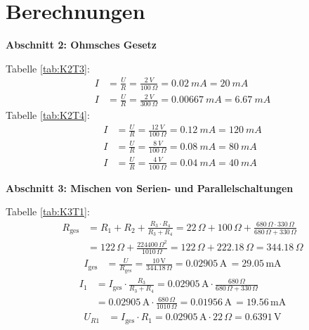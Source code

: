 \section{Berechnungen}\label{appA}

\large \textbf{Abschnitt 2: Ohmsches Gesetz}

Tabelle \ref{tab:K2T3}:
\begin{align*}
    I &= \frac{U}{R}=\frac{\SI{2}{V}}{\SI{100}{\Omega}}=\SI{0,02}{mA}=\SI{20}{mA}\\
    I &= \frac{U}{R}=\frac{\SI{2}{V}}{\SI{300}{\Omega}}=\SI{0,00667}{mA}=\SI{6,67}{mA}
\end{align*}
Tabelle \ref{tab:K2T4}:
\begin{align*}
    I &= \frac{U}{R}=\frac{\SI{12}{V}}{\SI{100}{\Omega}}=\SI{0,12}{mA}=\SI{120}{mA}\\
    I &= \frac{U}{R}=\frac{\SI{8}{V}}{\SI{100}{\Omega}}=\SI{0,08}{mA}=\SI{80}{mA}\\
    I &= \frac{U}{R}=\frac{\SI{4}{V}}{\SI{100}{\Omega}}=\SI{0,04}{mA}=\SI{40}{mA}
\end{align*}

\large \textbf{Abschnitt 3: Mischen von Serien- und Parallelschaltungen}

Tabelle \ref{tab:K3T1}:
\begin{align*}
    R_{\text{ges}} &= R_1 + R_2 + \frac{R_3 \cdot R_4}{R_3 + R_4} = 22 \, \Omega + 100 \, \Omega + \frac{680 \, \Omega \cdot 330 \, \Omega}{680 \, \Omega + 330 \, \Omega} \\
    &= 122 \, \Omega + \frac{224400 \, \Omega^2}{1010 \, \Omega} = 122 \, \Omega + 222.18 \, \Omega = 344.18 \, \Omega
\end{align*}
\begin{align*}
    I_{\text{ges}} &= \frac{U}{R_{\text{ges}}} = \frac{10 \, \mathrm{V}}{344.18 \, \Omega} = 0.02905 \, \mathrm{A} \, =29.05 \, \mathrm{mA}
\end{align*}
\begin{align*}
    I_1 &= I_{\text{ges}} \cdot \frac{R_3}{R_3 + R_4} = 0.02905 \, \mathrm{A} \cdot \frac{680 \, \Omega}{680 \, \Omega + 330 \, \Omega} \\
    &= 0.02905 \, \mathrm{A} \cdot \frac{680 \, \Omega}{1010 \, \Omega} = 0.01956 \, \mathrm{A} \, = 19.56 \, \mathrm{mA}
\end{align*}
\begin{align*}
    U_{R1} &= I_{\text{ges}} \cdot R_1 = 0.02905 \, \mathrm{A} \cdot 22 \, \Omega = 0.6391 \, \mathrm{V}
\end{align*}

